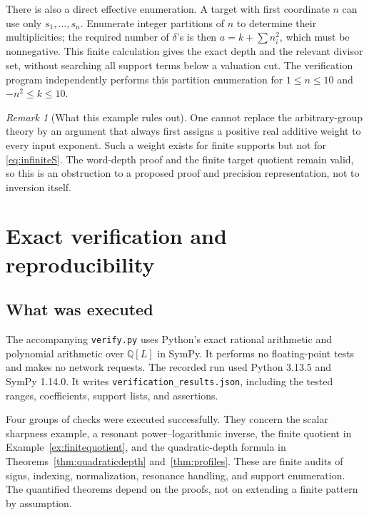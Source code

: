 \documentclass[11pt,a4paper]{article}
\theoremstyle{definition}
\theoremstyle{remark}
\newtheorem{remark}[theorem]{Remark}
\newcommand{\Q}{\mathbb Q}
\newcommand{\pathcode}[1]{\nolinkurl{#1}}
\begin{document}
There is also a direct effective enumeration. A target with first
coordinate $n$ can use only $s_1,\ldots,s_n$. Enumerate integer partitions
of $n$ to determine their multiplicities; the required number of
$\delta$'s is then $a=k+\sum n_i^2$, which must be nonnegative.
This finite calculation gives the exact depth and the relevant divisor
set, without searching all support terms below a valuation cut. The
verification program independently performs this partition enumeration
for $1\le n\le10$ and $-n^2\le k\le10$.

\begin{remark}[What this example rules out]
One cannot replace the arbitrary-group theory by an argument that always
first assigns a positive real additive weight to every input exponent.
Such a weight exists for finite supports but not for \eqref{eq:infiniteS}.
The word-depth proof and the finite target quotient remain valid, so this
is an obstruction to a proposed proof and precision representation, not
to inversion itself.
\end{remark}

\section{Exact verification and reproducibility}
\label{sec:verification}

\subsection{What was executed}
The accompanying \pathcode{verify.py} uses Python's exact rational
arithmetic and polynomial arithmetic over $\Q[L]$ in SymPy. It performs no
floating-point tests and makes no network requests. The recorded run used
Python 3.13.5 and SymPy 1.14.0. It writes
\pathcode{verification_results.json}, including the tested ranges,
coefficients, support lists, and assertions.

Four groups of checks were executed successfully. They concern the scalar
sharpness example, a resonant power--logarithmic inverse, the finite
quotient in Example~\ref{ex:finitequotient}, and the quadratic-depth formula
in Theorems~\ref{thm:quadraticdepth} and~\ref{thm:profiles}. These are finite audits of signs,
indexing, normalization, resonance handling, and support enumeration.
The quantified theorems depend on the proofs, not on extending a finite
pattern by assumption.
\end{document}
